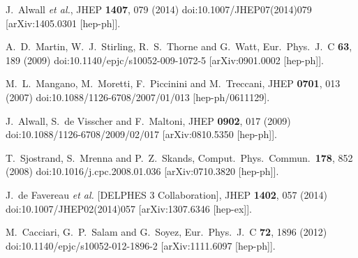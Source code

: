 \documentclass{ws-mpla}
\begin{document}
\begin{thebibliography}{99}
  J.~Alwall {\it et al.},
  JHEP {\bf 1407}, 079 (2014)
  doi:10.1007/JHEP07(2014)079
  [arXiv:1405.0301 [hep-ph]].
    
  A.~D.~Martin, W.~J.~Stirling, R.~S.~Thorne and G.~Watt,
  Eur.\ Phys.\ J.\ C {\bf 63}, 189 (2009)
  doi:10.1140/epjc/s10052-009-1072-5
  [arXiv:0901.0002 [hep-ph]].
  
  M.~L.~Mangano, M.~Moretti, F.~Piccinini and M.~Treccani,
  JHEP {\bf 0701}, 013 (2007)
  doi:10.1088/1126-6708/2007/01/013
  [hep-ph/0611129].

  J.~Alwall, S.~de Visscher and F.~Maltoni,
  JHEP {\bf 0902}, 017 (2009)
  doi:10.1088/1126-6708/2009/02/017
  [arXiv:0810.5350 [hep-ph]].

  T.~Sjostrand, S.~Mrenna and P.~Z.~Skands,
  Comput.\ Phys.\ Commun.\  {\bf 178}, 852 (2008)
  doi:10.1016/j.cpc.2008.01.036
  [arXiv:0710.3820 [hep-ph]].

  J.~de Favereau {\it et al.} [DELPHES 3 Collaboration],
  JHEP {\bf 1402}, 057 (2014)
  doi:10.1007/JHEP02(2014)057
  [arXiv:1307.6346 [hep-ex]].

  M.~Cacciari, G.~P.~Salam and G.~Soyez,
  Eur.\ Phys.\ J.\ C {\bf 72}, 1896 (2012)
  doi:10.1140/epjc/s10052-012-1896-2
  [arXiv:1111.6097 [hep-ph]].
\end{thebibliography}
\end{document}
